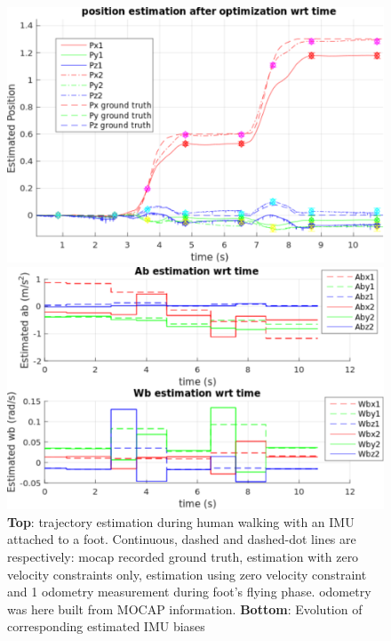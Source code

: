 \begin{figure}[tb]
\centering
\includegraphics[scale=0.5]{figures/Result_position}
\par\vspace{4mm}
\includegraphics[scale=0.5]{figures/Result_bias}
\caption{ 
{\bf Top}: trajectory estimation during human walking with an IMU attached to a foot. Continuous, dashed and dashed-dot lines are respectively: mocap recorded ground truth, 
estimation with zero velocity constraints only, estimation using zero velocity constraint and 1 odometry measurement during foot's flying phase. odometry was here built from MOCAP information.
{\bf Bottom}: Evolution of corresponding estimated IMU biases 
}
\label{fig:forward_walk_IRI}
\end{figure}


